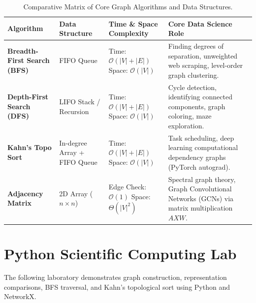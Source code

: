 \begin{table}[htbp]
\centering
\small
\begin{tabular}{p{2.6cm} p{3.2cm} p{3.5cm} p{4.5cm}}
\toprule
\textbf{Algorithm} & \textbf{Data Structure} & \textbf{Time \& Space Complexity} & \textbf{Core Data Science Role} \\
\midrule
\textbf{Breadth-First Search (BFS)} & FIFO Queue & Time: $\mathcal{O}(|V| + |E|)$ \newline Space: $\mathcal{O}(|V|)$ & Finding degrees of separation, unweighted web scraping, level-order graph clustering. \\
\addlinespace
\textbf{Depth-First Search (DFS)} & LIFO Stack / Recursion & Time: $\mathcal{O}(|V| + |E|)$ \newline Space: $\mathcal{O}(|V|)$ & Cycle detection, identifying connected components, graph coloring, maze exploration. \\
\addlinespace
\textbf{Kahn's Topo Sort} & In-degree Array + FIFO Queue & Time: $\mathcal{O}(|V| + |E|)$ \newline Space: $\mathcal{O}(|V|)$ & Task scheduling, deep learning computational dependency graphs (PyTorch autograd). \\
\addlinespace
\textbf{Adjacency Matrix} & 2D Array ($n \times n$) & Edge Check: $\mathcal{O}(1)$ \newline Space: $\Theta(|V|^2)$ & Spectral graph theory, Graph Convolutional Networks (GCNs) via matrix multiplication $A X W$. \\
\bottomrule
\end{tabular}
\caption{Comparative Matrix of Core Graph Algorithms and Data Structures.}
\end{table}

\section{Python Scientific Computing Lab}

The following laboratory demonstrates graph construction, representation comparisons, BFS traversal, and Kahn's topological sort using Python and NetworkX.

